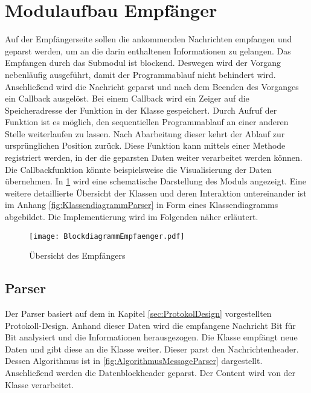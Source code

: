 \section{Modulaufbau Empf{\"a}nger}

Auf der Empf{\"a}ngerseite sollen die ankommenden Nachrichten empfangen und geparst
werden, um an die darin enthaltenen Informationen zu gelangen. Das Empfangen
durch das Submodul  ist blockend. Deswegen wird der Vorgang
nebenl{\"a}ufig ausgef{\"u}hrt, damit der Programmablauf nicht behindert wird.
Anschließend wird die Nachricht geparst und nach dem Beenden des Vorganges ein Callback
ausgel{\"o}st. Bei einem Callback wird ein Zeiger auf die Speicheradresse der
Funktion in der Klasse gespeichert. Durch Aufruf der Funktion ist es
m{\"o}glich, den sequentiellen Programmablauf an einer anderen Stelle
weiterlaufen zu lassen. Nach Abarbeitung dieser kehrt der Ablauf zur
urspr{\"u}nglichen Position zur{\"u}ck. Diese Funktion kann mittels einer
Methode registriert werden, in der die geparsten Daten weiter verarbeitet werden
k{\"o}nnen.
Die Callbackfunktion k{\"o}nnte beispielsweise die Visualisierung der Daten
{\"u}bernehmen. \newline 
In \ref{fig:BlockdiagrammEmpfaenger} wird eine schematische Darstellung des
Moduls angezeigt. Eine weitere detaillierte Übersicht der Klassen
und deren Interaktion untereinander ist im Anhang
\ref{fig:KlassendiagrammParser} in Form eines Klassendiagramms 
abgebildet.
Die Implementierung wird im Folgenden n{\"a}her erl{\"a}utert.

\begin{figure}[H]
\centering
\texttt{[image: BlockdiagrammEmpfaenger.pdf]}
\caption{{\"U}bersicht des Empf{\"a}ngers}
\label{fig:BlockdiagrammEmpfaenger}
\end{figure}

\subsection{Parser}

Der Parser basiert auf dem in Kapitel \ref{sec:ProtokolDesign}
vorgestellten Protokoll-Design.
Anhand dieser Daten wird die empfangene Nachricht Bit f{\"u}r Bit analysiert
und die Informationen herausgezogen. 
Die Klasse  empf{\"a}ngt neue Daten und gibt diese an
die Klasse  weiter. Dieser parst den Nachrichtenheader.
Dessen Algorithmus ist in \ref{fig:AlgorithmusMessageParser} dargestellt.
Anschlie{\ss}end werden die Datenblockheader geparst. Der Content wird von der
Klasse  verarbeitet.

